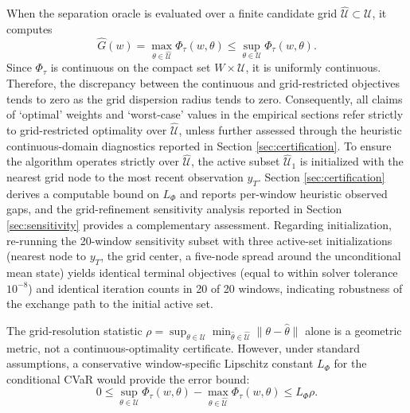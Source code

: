 \documentclass[smallcondensed]{svjour3}
\begin{document}
\begin{remark}
When the separation oracle is evaluated over a finite candidate grid $\widehat{\mathcal{U}} \subset \mathcal{U}$, it computes
\begin{equation}
\widehat{G}(w) = \max_{\theta \in \widehat{\mathcal{U}}} \Phi_\tau(w, \theta) \le \sup_{\theta \in \mathcal{U}} \Phi_\tau(w, \theta).
\end{equation}
Since $\Phi_\tau$ is continuous on the compact set $W \times \mathcal{U}$, it is uniformly continuous. Therefore, the discrepancy between the continuous and grid-restricted objectives tends to zero as the grid dispersion radius tends to zero. Consequently, all claims of `optimal' weights and `worst-case' values in the empirical sections refer strictly to grid-restricted optimality over $\widehat{\mathcal{U}}$, unless further assessed through the heuristic continuous-domain diagnostics reported in Section \ref{sec:certification}. To ensure the algorithm operates strictly over $\widehat{\mathcal{U}}$, the active subset $\widehat{\mathcal{U}}_1$ is initialized with the nearest grid node to the most recent observation $y_T$. Section \ref{sec:certification} derives a computable bound on $L_\Phi$ and reports per-window heuristic observed gaps, and the grid-refinement sensitivity analysis reported in Section \ref{sec:sensitivity} provides a complementary assessment. Regarding initialization, re-running the 20-window sensitivity subset with three active-set initializations (nearest node to $y_T$, the grid center, a five-node spread around the unconditional mean state) yields identical terminal objectives (equal to within solver tolerance $10^{-8}$) and identical iteration counts in 20 of 20 windows, indicating robustness of the exchange path to the initial active set.


The grid-resolution statistic $\rho = \sup_{\theta \in \mathcal{U}} \min_{\hat{\theta} \in \widehat{\mathcal{U}}} \|\theta - \hat{\theta}\|$ alone is a geometric metric, not a continuous-optimality certificate. However, under standard assumptions, a conservative window-specific Lipschitz constant $L_\Phi$ for the conditional CVaR would provide the error bound:
\begin{equation}
0 \le \sup_{\theta \in \mathcal{U}} \Phi_\tau(w, \theta) - \max_{\theta \in \widehat{\mathcal{U}}} \Phi_\tau(w, \theta) \le L_\Phi \rho.
\end{equation}


\end{remark}
\end{document}
